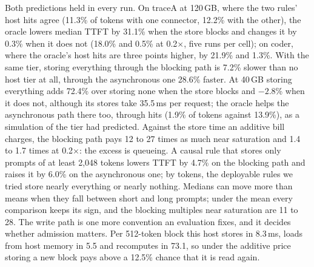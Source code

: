 \noindent Both predictions held in every run. On traceA at 120\,GB, where the two rules' host hits agree
(11.3\% of tokens with one connector, 12.2\% with the other), the oracle lowers median TTFT by 31.1\% when the
store blocks and changes it by 0.3\% when it does not (18.0\% and 0.5\% at 0.2$\times$, five runs per cell); on
coder, where the oracle's host hits are three points higher, by 21.9\% and 1.3\%. With the same tier, storing
everything through the blocking path is 7.2\% slower than no host tier at all, through the asynchronous one
28.6\% faster. At 40\,GB storing everything adds 72.4\% over storing none when the store blocks and $-2.8$\%
when it does not, although its stores take 35.5\,ms per request; the oracle helps the asynchronous path there
too, through hits (1.9\% of tokens against 13.9\%), as a simulation of the tier had predicted. Against the
store time an additive bill charges, the blocking path pays 12 to 27 times as much near saturation and 1.4 to
1.7 times at 0.2$\times$: the excess is queueing. A causal rule that stores only prompts of at least 2,048
tokens lowers TTFT by 4.7\% on the blocking path and raises it by 6.0\% on the asynchronous one; by tokens, the
deployable rules we tried store nearly everything or nearly nothing. Medians can move more than means when
they fall between short and long prompts; under the mean every comparison keeps its sign, and the blocking
multiples near saturation are 11 to 28. The write path is one more convention an evaluation fixes, and it
decides whether admission matters. Per 512-token block this host stores in 8.3\,ms, loads from host memory in
5.5 and recomputes in 73.1, so under the additive price storing a new block pays above a 12.5\% chance that
it is read again.

